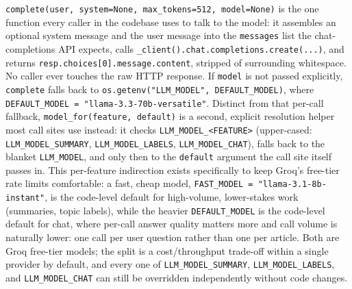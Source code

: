 \begin{sloppypar}
\texttt{complete(user, system=None, max\_tokens=512, model=None)} is the one function every caller in the codebase uses to talk to the model: it assembles an optional system message and the user message into the \texttt{messages} list the chat-completions API expects, calls \texttt{\_client().chat.completions.create(...)}, and returns \texttt{resp.choices[0].message.content}, stripped of surrounding whitespace. No caller ever touches the raw HTTP response. If \texttt{model} is not passed explicitly, \texttt{complete} falls back to \texttt{os.getenv("LLM\_MODEL", DEFAULT\_MODEL)}, where \texttt{DEFAULT\_MODEL = "llama-3.3-70b-\allowbreak versatile"}. Distinct from that per-call fallback, \texttt{model\_for(feature, default)} is a second, explicit resolution helper most call sites use instead: it checks \texttt{LLM\_MODEL\_<FEATURE>} (upper-cased: \texttt{LLM\_MODEL\_SUMMARY}, \texttt{LLM\_MODEL\_LABELS}, \texttt{LLM\_MODEL\_CHAT}), falls back to the blanket \texttt{LLM\_MODEL}, and only then to the \texttt{default} argument the call site itself passes in. This per-feature indirection exists specifically to keep Groq's free-tier rate limits comfortable: a fast, cheap model, \texttt{FAST\_MODEL = "llama-3.1-8b-\allowbreak instant"}, is the code-level default for high-volume, lower-stakes work (summaries, topic labels), while the heavier \texttt{DEFAULT\_MODEL} is the code-level default for chat, where per-call answer quality matters more and call volume is naturally lower: one call per user question rather than one per article. Both are Groq free-tier models; the split is a cost/throughput trade-off within a single provider by default, and every one of \texttt{LLM\_MODEL\_SUMMARY}, \texttt{LLM\_MODEL\_LABELS}, and \texttt{LLM\_MODEL\_CHAT} can still be overridden independently without code changes.
\end{sloppypar}

